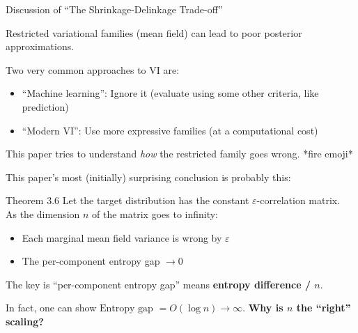 \documentclass[8pt]{beamer}\usepackage[]{graphicx}\usepackage[]{color}
\begin{document}

\begin{frame}{Discussion of ``The Shrinkage-Delinkage Trade-off''}

Restricted variational families (mean field) can lead to poor posterior approximations.

Two very common approaches to VI are:
%
\begin{itemize}
\item ``Machine learning'': Ignore it (evaluate using some other criteria, like prediction)
\item ``Modern VI'': Use more expressive families (at a computational cost)
\end{itemize}
%
This paper tries to understand \emph{how} the restricted family goes wrong.  *fire emoji*

\pause
\hrulefill

This paper's most (initially) surprising conclusion is probably this:

\begin{block}{Theorem 3.6}
%
Let the target distribution has the constant $\varepsilon$-correlation matrix.\\
As the dimension $n$ of the matrix goes to infinity:
%
\begin{itemize}
\item Each marginal mean field variance is wrong by $\varepsilon$
\item The per-component entropy gap $\rightarrow 0$
\end{itemize}
%
\end{block}


\pause
The key is ``per-component entropy gap'' means \textbf{entropy difference / $n$}.


In fact, one can show  $\textrm{Entropy gap } = O(\log n) \rightarrow \infty$.
\textbf{Why is $n$ the ``right'' scaling?}
%
%


\end{frame}
\end{document}
